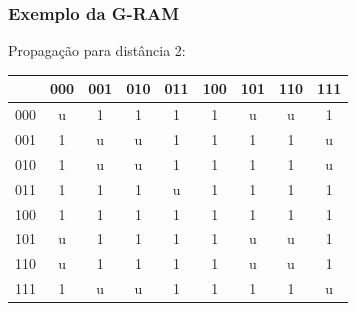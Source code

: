 \documentclass{beamer}
\begin{document}
\begin{frame}
    \frametitle{Exemplo da G-RAM}
    Propagação para distância 2:

    \begin{table}
        \centering
        \begin{tabular}{|c|c|c|c|c|c|c|c|c|}
            \hline
                &       000 &       001 &       010 &       011 &       100 &       101 &       110 &       111\\
            \hline
            000 &        u  & \alert 1  & \alert 1  &        1  &        1  &        u  &        u  & \alert 1 \\
            \hline
            001 &        1  &        u  &        u  & \alert 1  &        1  &        1  &        1  &        u \\
            \hline
            010 &        1  &        u  &        u  & \alert 1  &        1  &        1  &        1  &        u \\
            \hline
            011 &        1  &        1  &        1  &        u  &        1  &        1  &        1  &        1 \\
            \hline
            100 & \alert 1  &        1  &        1  &        1  &        1  & \alert 1  & \alert 1  &        1 \\
            \hline
            101 &        u  & \alert 1  & \alert 1  &        1  &        1  &        u  &        u  & \alert 1 \\
            \hline
            110 &        u  & \alert 1  & \alert 1  &        1  &        1  &        u  &        u  & \alert 1 \\
            \hline
            111 &        1  &        u  &        u  & \alert 1  &        1  &        1  &        1  &        u \\
            \hline

        \end{tabular}
    \end{table}
\end{frame}
\end{document}
